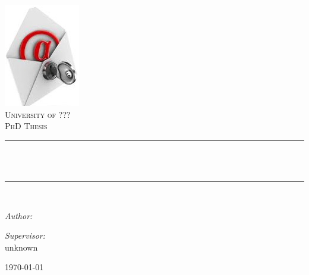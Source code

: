 \begin{titlepage}
\pagecolor{orange}\afterpage{\nopagecolor}
\begin{center}
\includegraphics[height=0.4\textwidth]{./inc/logo}~\\[1cm]

\textsc{\LARGE University of ???}\\[1.5cm]

\textsc{\Large PhD Thesis}\\[0.5cm]

\newcommand{\HRule}{\rule{\linewidth}{0.5mm}}
\HRule \\[0.4cm]
{ \huge \bfseries \makeatletter\@title\makeatother \\[0.4cm] }

\HRule \\[1.5cm]

\begin{minipage}{0.6\textwidth}
\begin{flushleft} \large
\emph{Author:}\\
 \makeatletter\@author\makeatother
\end{flushleft}
\end{minipage}
\begin{minipage}{0.6\textwidth}
\begin{flushright} \large
\emph{Supervisor:} \\
 unknown
\end{flushright}
\end{minipage}

\vfill

{\large \today}

\end{center}
\end{titlepage}

